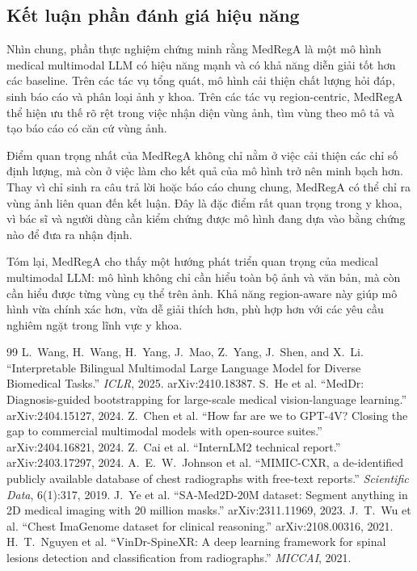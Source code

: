 \documentclass[12pt,a4paper,oneside]{extarticle}
\begin{document}
\subsection{Kết luận phần đánh giá hiệu năng}

Nhìn chung, phần thực nghiệm chứng minh rằng MedRegA là một mô hình medical multimodal LLM có hiệu năng mạnh và có khả năng diễn giải tốt hơn các baseline. Trên các tác vụ tổng quát, mô hình cải thiện chất lượng hỏi đáp, sinh báo cáo và phân loại ảnh y khoa. Trên các tác vụ region-centric, MedRegA thể hiện ưu thế rõ rệt trong việc nhận diện vùng ảnh, tìm vùng theo mô tả và tạo báo cáo có căn cứ vùng ảnh.

Điểm quan trọng nhất của MedRegA không chỉ nằm ở việc cải thiện các chỉ số định lượng, mà còn ở việc làm cho kết quả của mô hình trở nên minh bạch hơn. Thay vì chỉ sinh ra câu trả lời hoặc báo cáo chung chung, MedRegA có thể chỉ ra vùng ảnh liên quan đến kết luận. Đây là đặc điểm rất quan trọng trong y khoa, vì bác sĩ và người dùng cần kiểm chứng được mô hình đang dựa vào bằng chứng nào để đưa ra nhận định.

Tóm lại, MedRegA cho thấy một hướng phát triển quan trọng của medical multimodal LLM: mô hình không chỉ cần hiểu toàn bộ ảnh và văn bản, mà còn cần hiểu được từng vùng cụ thể trên ảnh. Khả năng region-aware này giúp mô hình vừa chính xác hơn, vừa dễ giải thích hơn, phù hợp hơn với các yêu cầu nghiêm ngặt trong lĩnh vực y khoa.

\renewcommand{\refname}{Tài liệu tham khảo}
\begin{thebibliography}{99}
\small
{} L.~Wang, H.~Wang, H.~Yang, J.~Mao, Z.~Yang, J.~Shen, and X.~Li.
``Interpretable Bilingual Multimodal Large Language Model for Diverse Biomedical Tasks.''
\textit{ICLR}, 2025. arXiv:2410.18387.
 S.~He et al. ``MedDr: Diagnosis-guided bootstrapping for large-scale medical
vision-language learning.'' arXiv:2404.15127, 2024.
 Z.~Chen et al. ``How far are we to GPT-4V? Closing the gap to commercial
multimodal models with open-source suites.'' arXiv:2404.16821, 2024.
 Z.~Cai et al. ``InternLM2 technical report.'' arXiv:2403.17297, 2024.
 A.~E.~W.~Johnson et al. ``MIMIC-CXR, a de-identified publicly available
database of chest radiographs with free-text reports.'' \textit{Scientific Data}, 6(1):317, 2019.
 J.~Ye et al. ``SA-Med2D-20M dataset: Segment anything in 2D medical imaging
with 20 million masks.'' arXiv:2311.11969, 2023.
 J.~T.~Wu et al. ``Chest ImaGenome dataset for clinical reasoning.''
arXiv:2108.00316, 2021.
 H.~T.~Nguyen et al. ``VinDr-SpineXR: A deep learning framework for spinal
lesions detection and classification from radiographs.'' \textit{MICCAI}, 2021.
\end{thebibliography}
\end{document}
